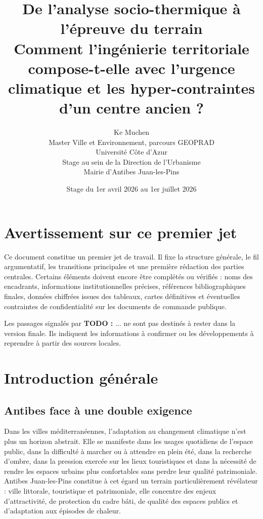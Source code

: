 \documentclass[11pt,a4paper]{report}
\title{
  \textbf{De l'analyse socio-thermique à l'épreuve du terrain}\\
  \large Comment l'ingénierie territoriale compose-t-elle avec l'urgence climatique et les hyper-contraintes d'un centre ancien ?
}
\author{
  Ke Muchen\\
  Master Ville et Environnement, parcours GEOPRAD\\
  Université Côte d'Azur\\[0.5em]
  Stage au sein de la Direction de l'Urbanisme\\
  Mairie d'Antibes Juan-les-Pins
}
\date{Stage du 1er avril 2026 au 1er juillet 2026}
\newcommand{\todo}[1]{\textcolor{todored}{\textbf{TODO :} #1}}
\begin{document}
\maketitle

\chapter*{Avertissement sur ce premier jet}

Ce document constitue un premier jet de travail. Il fixe la structure générale, le fil argumentatif, les transitions principales et une première rédaction des parties centrales. Certains éléments doivent encore être complétés ou vérifiés : noms des encadrants, informations institutionnelles précises, références bibliographiques finales, données chiffrées issues des tableaux, cartes définitives et éventuelles contraintes de confidentialité sur les documents de commande publique.

Les passages signalés par \todo{...} ne sont pas destinés à rester dans la version finale. Ils indiquent les informations à confirmer ou les développements à reprendre à partir des sources locales.

\tableofcontents
\newpage

\chapter*{Introduction générale}

\section*{Antibes face à une double exigence}

Dans les villes méditerranéennes, l'adaptation au changement climatique n'est plus un horizon abstrait. Elle se manifeste dans les usages quotidiens de l'espace public, dans la difficulté à marcher ou à attendre en plein été, dans la recherche d'ombre, dans la pression exercée sur les lieux touristiques et dans la nécessité de rendre les espaces urbains plus confortables sans perdre leur qualité patrimoniale. Antibes Juan-les-Pins constitue à cet égard un terrain particulièrement révélateur : ville littorale, touristique et patrimoniale, elle concentre des enjeux d'attractivité, de protection du cadre bâti, de qualité des espaces publics et d'adaptation aux épisodes de chaleur.
\end{document}
